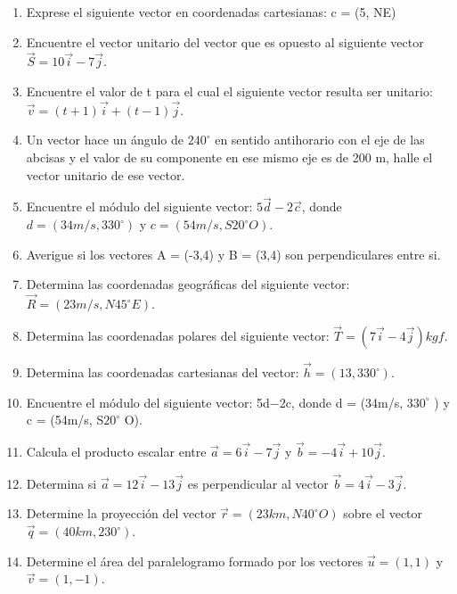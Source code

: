 \documentclass[a5paper,pagesize,10pt,bibtotoc,pointlessnumbers,
normalheadings,DIV=9,fleqn,x11names,table,twoside=false]{scrbook}
\begin{document}
\begin{enumerate}
 \item Exprese el siguiente vector en coordenadas cartesianas: c = (5, NE)
 
 \item Encuentre el vector unitario del vector que es opuesto al siguiente vector $\vec{S} =  10\vec{i}-7\vec{j}$.
 
 \item Encuentre el valor de t para el cual el siguiente vector resulta ser unitario: $\vec{v} = (t+1)\vec{i} +(t-1)\vec{j}$.

 
 \item Un vector hace un ángulo de $240^\circ$ en sentido antihorario con el eje de las abcisas y el valor de su componente 
en ese mismo eje es de 200 m, halle el vector unitario de ese vector.
 
 \item Encuentre el módulo del siguiente vector: $5\vec{d}-2\vec{c}$, donde $d=(34 m/s, 330^\circ)$ y $c = (54m/s, S20^\circ 
O)$.

\item Averigue si los vectores A = (-3,4) y B = (3,4) son perpendiculares entre si.
 
 \item Determina las coordenadas geográficas del siguiente vector: $\vec{R}=(23 m/s,N45^\circ E)$.
 
 \item Determina las coordenadas polares del siguiente vector: $\vec{T}=(7\vec{i}-4\vec{j})kgf$.
 
 \item Determina las coordenadas cartesianas del vector: $\vec{h}=(13,330^\circ)$.
 
 \item Encuentre el módulo del siguiente vector: 5d−2c, donde d = (34m/s, $330^\circ$ ) y c = (54m/s,
S$20^\circ$ O).

 \item Calcula el producto escalar entre $\vec{a}=6\vec{i}-7\vec{j}$ y $\vec{b}=-4\vec{i}+10\vec{j}$.

\item Determina si $\vec{a} = 12\vec{i}-13\vec{j}$ es perpendicular al vector $\vec{b}=4\vec{i}-3\vec{j}$.

\item Determine la proyección del vector $\vec{r} = (23 km, N40^\circ O)$ sobre el vector $\vec{q}=(40km,230^\circ)$.

\item Determine el área del paralelogramo formado por los vectores $\vec{u}=(1,1)$ y $\vec{v}=(1,-1)$.


\end{enumerate}
\end{document}
